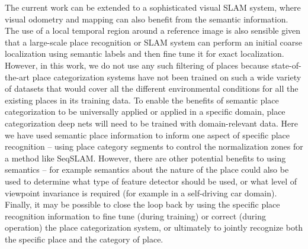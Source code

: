 \documentclass[letterpaper, 10 pt, conference]{ieeeconf}  %
\begin{document}
The current work can be extended to a sophisticated visual SLAM system, where visual odometry and mapping can also benefit from the semantic information. The use of a local temporal region around a reference image is also sensible given that a large-scale place recognition or SLAM system can perform an initial coarse localization using semantic labels and then fine tune it for exact localization. However, in this work, we do not use any such filtering of places because state-of-the-art place categorization systems have not been trained on such a wide variety of datasets that would cover all the different environmental conditions for all the existing places in its training data.
To enable the benefits of semantic place categorization to be universally applied or applied in a specific domain, place categorization deep nets will need to be trained with domain-relevant data.
Here we have used semantic place information to inform one aspect of specific place recognition – using place category segments to control the normalization zones for a method like SeqSLAM. However, there are other potential benefits to using semantics – for example semantics about the nature of the place could also be used to determine what type of feature detector should be used, or what level of viewpoint invariance is required (for example in a self-driving car domain). Finally, it may be possible to close the loop back by using the specific place recognition information to fine tune (during training) or correct (during operation) the place categorization system, or ultimately to jointly recognize both the specific place and the category of place.





\end{document}
